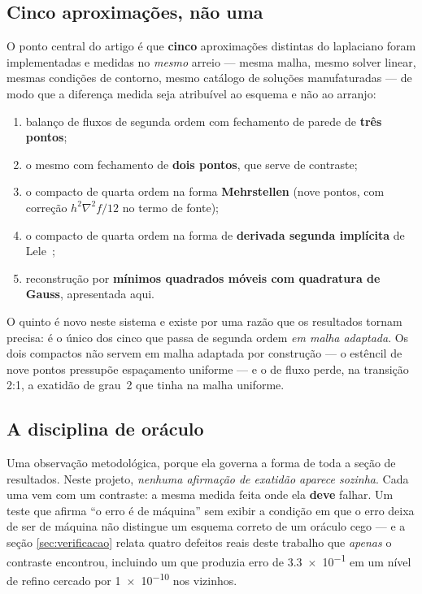 \subsection{Cinco aproximações, não uma}

O ponto central do artigo é que \textbf{cinco} aproximações distintas do
laplaciano foram implementadas e medidas no \emph{mesmo} arreio --- mesma malha,
mesmo solver linear, mesmas condições de contorno, mesmo catálogo de soluções
manufaturadas --- de modo que a diferença medida seja atribuível ao esquema e não
ao arranjo:

\begin{enumerate}
\item balanço de fluxos de segunda ordem com fechamento de parede de
      \textbf{três pontos};
\item o mesmo com fechamento de \textbf{dois pontos}, que serve de contraste;
\item o compacto de quarta ordem na forma \textbf{Mehrstellen} (nove pontos, com
      correção $h^2\nabla^2 f/12$ no termo de fonte);
\item o compacto de quarta ordem na forma de \textbf{derivada segunda implícita}
      de Lele~\cite{lele1992};
\item reconstrução por \textbf{mínimos quadrados móveis com quadratura de
      Gauss}, apresentada aqui.
\end{enumerate}

O quinto é novo neste sistema e existe por uma razão que os resultados tornam
precisa: é o único dos cinco que passa de segunda ordem \emph{em malha
adaptada}. Os dois compactos não servem em malha adaptada por construção --- o
estêncil de nove pontos pressupõe espaçamento uniforme --- e o de fluxo perde,
na transição 2:1, a exatidão de grau~2 que tinha na malha uniforme.

\subsection{A disciplina de oráculo}

Uma observação metodológica, porque ela governa a forma de toda a seção de
resultados. Neste projeto, \emph{nenhuma afirmação de exatidão aparece sozinha}.
Cada uma vem com um contraste: a mesma medida feita onde ela \textbf{deve}
falhar. Um teste que afirma ``o erro é de máquina'' sem exibir a condição em que
o erro deixa de ser de máquina não distingue um esquema correto de um oráculo
cego --- e a seção \ref{sec:verificacao} relata quatro defeitos reais deste
trabalho que \emph{apenas} o contraste encontrou, incluindo um que produzia erro
de \num{3.3e-1} em um nível de refino cercado por \num{1e-10} nos vizinhos.
